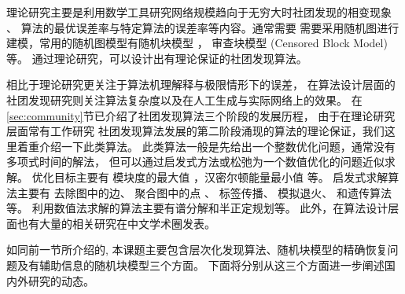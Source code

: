 理论研究主要是利用数学工具研究网络规模趋向于无穷大时社团发现的相变现象
\cite{lenka2016physics}、
算法的最优误差率与特定算法的误差率等内容。通常需要
需要采用随机图进行建模，常用的随机图模型有随机块模型
\cite{holland1983stochastic}，
审查块模型 (Censored Block Model) \cite{hajek2015censored}等。
通过理论研究，可以设计出有理论保证的社团发现算法。%


相比于理论研究更关注于算法机理解释与极限情形下的误差，
在算法设计层面的社团发现研究则关注算法复杂度以及在人工生成与实际网络上的效果。
在\ref{sec:community}节已介绍了社团发现算法三个阶段的发展历程，
由于在理论研究层面常有工作研究
社团发现算法发展的第二阶段涌现的算法的理论保证，我们这里着重介绍一下此类算法。
此类算法一般是先给出一个整数优化问题，通常没有多项式时间的解法，
但可以通过启发式方法或松弛为一个数值优化的问题近似求解。
优化目标主要有
模块度的最大值 \cite{newman2006modularity}，汉密尔顿能量最小值
\cite{reichardt2004potts} 等。
启发式求解算法主要有
去除图中的边\cite{girvan2002community}、
聚合图中的点 \cite{clauset2004finding}、
标签传播\cite{raghavan2007near}、
模拟退火\cite{massen2005annealing}、
和遗传算法 \cite{pizzuti2008ga}等。
利用数值法求解的算法主要有谱分解\cite{coja-oghlan_2010}和半正定规划\cite{chen2012sdp}等。
此外，在算法设计层面也有大量的相关研究在中文学术圈发表\cite{chen2008automata,zhu2009genetic}。

如同前一节所介绍的, 本课题主要包含层次化发现算法、随机块模型的精确恢复问题及有辅助信息的随机块模型三个方面。
下面将分别从这三个方面进一步阐述国内外研究的动态。
